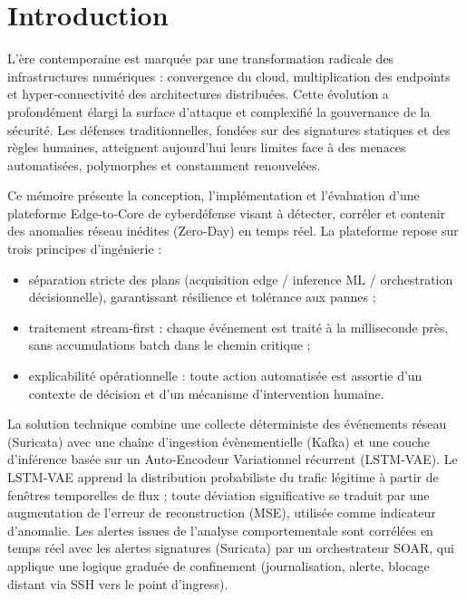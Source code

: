 
\chapter*{Introduction}

L'ère contemporaine est marquée par une transformation radicale des infrastructures numériques : convergence du cloud, multiplication des endpoints et hyper‑connectivité des architectures distribuées. Cette évolution a profondément élargi la surface d'attaque et complexifié la gouvernance de la sécurité. Les défenses traditionnelles, fondées sur des signatures statiques et des règles humaines, atteignent aujourd'hui leurs limites face à des menaces automatisées, polymorphes et constamment renouvelées.

Ce mémoire présente la conception, l'implémentation et l'évaluation d'une plateforme Edge‑to‑Core de cyberdéfense visant à détecter, corréler et contenir des anomalies réseau inédites (Zero‑Day) en temps réel. La plateforme repose sur trois principes d'ingénierie :
\begin{itemize}
  \item séparation stricte des plans (acquisition edge / inference ML / orchestration décisionnelle), garantissant résilience et tolérance aux pannes ;
  \item traitement stream‑first : chaque événement est traité à la milliseconde près, sans accumulations batch dans le chemin critique ;
  \item explicabilité opérationnelle : toute action automatisée est assortie d'un contexte de décision et d'un mécanisme d'intervention humaine.
\end{itemize}

La solution technique combine une collecte déterministe des événements réseau (Suricata) avec une chaîne d'ingestion évènementielle (Kafka) et une couche d'inférence basée sur un Auto‑Encodeur Variationnel récurrent (LSTM‑VAE). Le LSTM‑VAE apprend la distribution probabiliste du trafic légitime à partir de fenêtres temporelles de flux ; toute déviation significative se traduit par une augmentation de l'erreur de reconstruction (MSE), utilisée comme indicateur d'anomalie. Les alertes issues de l'analyse comportementale sont corrélées en temps réel avec les alertes signatures (Suricata) par un orchestrateur SOAR, qui applique une logique graduée de confinement (journalisation, alerte, blocage distant via SSH vers le point d'ingress).


